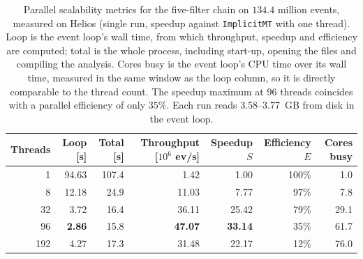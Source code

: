 \begin{table}[htbp]
\centering
\caption{Parallel scalability metrics for the five-filter chain on $134.4$ million events, measured on Helios (single run, speedup against \texttt{ImplicitMT} with one thread). Loop is the event loop's wall time, from which throughput, speedup and efficiency are computed; total is the whole process, including start-up, opening the files and compiling the analysis. Cores busy is the event loop's CPU time over its wall time, measured in the same window as the loop column, so it is directly comparable to the thread count. The speedup maximum at 96 threads coincides with a parallel efficiency of only $35\%$. Each run reads 3.58--3.77~GB from disk in the event loop.}
\label{tab:scalability-chain}
\setlength{\tabcolsep}{5pt}
\begin{tabular}{rrrrrrr}
\toprule
Threads & Loop [s] & Total [s] & Throughput [$10^6$ ev/s] & Speedup $S$ & Efficiency $E$ & Cores busy \\
\midrule
 1 & 94.63 & 107.4 & 1.42 & 1.00 & 100\% & 1.0 \\
 8 & 12.18 & 24.9 & 11.03 & 7.77 & 97\% & 7.8 \\
32 & 3.72 & 16.4 & 36.11 & 25.42 & 79\% & 29.1 \\
96 & \textbf{2.86} & 15.8 & \textbf{47.07} & \textbf{33.14} & 35\% & 61.7 \\
192 & 4.27 & 17.3 & 31.48 & 22.17 & 12\% & 76.0 \\
\bottomrule
\end{tabular}
\end{table}
